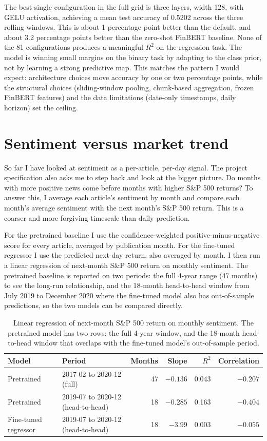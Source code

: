 \documentclass[11pt]{article}
\begin{document}
The best single configuration in the full grid is three layers, width 128, with GELU activation, achieving a mean test accuracy of 0.5202 across the three rolling windows. This is about 1 percentage point better than the default, and about 3.2 percentage points better than the zero-shot FinBERT baseline. None of the 81 configurations produces a meaningful $R^2$ on the regression task. The model is winning small margins on the binary task by adapting to the class prior, not by learning a strong predictive map. This matches the pattern I would expect: architecture choices move accuracy by one or two percentage points, while the structural choices (sliding-window pooling, chunk-based aggregation, frozen FinBERT features) and the data limitations (date-only timestamps, daily horizon) set the ceiling.

\section{Sentiment versus market trend}

So far I have looked at sentiment as a per-article, per-day signal. The project specification also asks me to step back and look at the bigger picture. Do months with more positive news come before months with higher S\&P 500 returns? To answer this, I average each article's sentiment by month and compare each month's average sentiment with the next month's S\&P 500 return. This is a coarser and more forgiving timescale than daily prediction.

For the pretrained baseline I use the confidence-weighted positive-minus-negative score for every article, averaged by publication month. For the fine-tuned regressor I use the predicted next-day return, also averaged by month. I then run a linear regression of next-month S\&P 500 return on monthly sentiment. The pretrained baseline is reported on two periods: the full 4-year range (47 months) to see the long-run relationship, and the 18-month head-to-head window from July 2019 to December 2020 where the fine-tuned model also has out-of-sample predictions, so the two models can be compared directly.

\begin{table}[h]
\centering
\small
\begin{tabular}{llrrrr}
\toprule
Model & Period & Months & Slope & $R^2$ & Correlation \\
\midrule
Pretrained          & 2017-02 to 2020-12 (full)          & 47 & $-0.136$ & 0.043 & $-0.207$ \\
Pretrained          & 2019-07 to 2020-12 (head-to-head)  & 18 & $-0.285$ & 0.163 & $-0.404$ \\
Fine-tuned regressor & 2019-07 to 2020-12 (head-to-head) & 18 & $-3.99$  & 0.003 & $-0.055$ \\
\bottomrule
\end{tabular}
\caption{Linear regression of next-month S\&P 500 return on monthly sentiment. The pretrained model has two rows: the full 4-year window, and the 18-month head-to-head window that overlaps with the fine-tuned model's out-of-sample period.}
\label{tab:market_trend}
\end{table}
\end{document}

